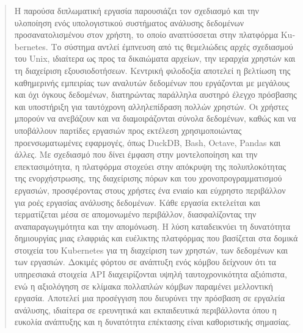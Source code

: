 \documentclass[
	12pt, %
	twoside,
	english,
	onehalfspacing, %
	liststotoc, %
	toctotoc, %
	parskip, %
	headsepline, %
	chapterinoneline, %
]{MastersDoctoralThesis} %
\begin{document}

\begin{abstract}
	\addchaptertocentry{\abstractname} %
	Η παρούσα διπλωματική εργασία παρουσιάζει τον σχεδιασμό και την υλοποίηση 
	ενός υπολογιστικού συστήματος ανάλυσης δεδομένων προσανατολισμένου στον 
	χρήστη, το οποίο αναπτύσσεται στην πλατφόρμα \textlatin{Kubernetes}. 
	Το σύστημα αντλεί έμπνευση από τις θεμελιώδεις αρχές σχεδιασμού του
	\textlatin{Unix}, ιδιαίτερα ως προς τα δικαιώματα αρχείων, την ιεραρχία 
	χρηστών και τη διαχείριση εξουσιοδοτήσεων. Κεντρική φιλοδοξία αποτελεί η 
	βελτίωση της καθημερινής εμπειρίας των αναλυτών δεδομένων που εργάζονται 
	με μεγάλους και όχι όγκους δεδομένων, διατηρώντας παράλληλα αυστηρό έλεγχο 
	πρόσβασης και υποστήριξη για ταυτόχρονη αλληλεπίδραση πολλών χρηστών. 
	Οι χρήστες μπορούν να ανεβάζουν και να διαμοιράζονται σύνολα δεδομένων, 
	καθώς και να υποβάλλουν παρτίδες εργασιών προς εκτέλεση χρησιμοποιώντας 
	προενσωματωμένες εφαρμογές, όπως \textlatin{DuckDB}, \textlatin{Bash}, 
	\textlatin{Octave}, \textlatin{Pandas} και άλλες. Με σχεδιασμό που δίνει
	έμφαση στην μοντελοποίηση και την επεκτασιμότητα, η πλατφόρμα στοχεύει 
	στην απόκρυψη της πολυπλοκότητας της ενορχήστρωσης, της διαχείρισης πόρων 
	και του χρονοπρογραμματισμού εργασιών, προσφέροντας στους χρήστες ένα 
	ενιαίο και εύχρηστο περιβάλλον για ροές εργασίας ανάλυσης δεδομένων. 
	Κάθε εργασία εκτελείται και τερματίζεται μέσα σε απομονωμένο περιβάλλον,
	διασφαλίζοντας την αναπαραγωγιμότητα και την απομόνωση. Η λύση καταδεικνύει
	τη δυνατότητα δημιουργίας μιας ελαφριάς και ευέλικτης πλατφόρμας που βασίζεται
	στα δομικά στοιχεία του \textlatin{Kubernetes} για τη διαχείριση
	των χρηστών, των δεδομένων και των εργασιών. Δοκιμές φόρτου σε ανάπτυξη ενός κόμβου
	δείχνουν ότι τα υπηρεσιακά στοιχεία \textlatin{API} διαχειρίζονται υψηλή ταυτοχρονικότητα
	αξιόπιστα, ενώ η αξιολόγηση σε κλίμακα πολλαπλών κόμβων παραμένει μελλοντική εργασία.
	Αποτελεί μια προσέγγιση που διευρύνει την πρόσβαση σε εργαλεία ανάλυσης, ιδιαίτερα σε
	ερευνητικά και εκπαιδευτικά περιβάλλοντα όπου η ευκολία ανάπτυξης και η δυνατότητα
	επέκτασης είναι καθοριστικής σημασίας.
\end{abstract}

\end{document}
